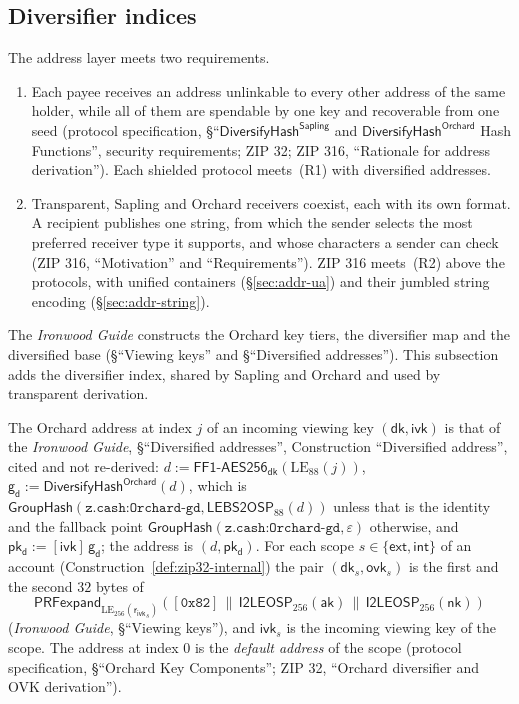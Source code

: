 \documentclass[11pt,a4paper]{article}
\theoremstyle{definition}
\newcommand{\GroupHash}{\ensuremath{\mathsf{GroupHash}}}
\newcommand{\aksym}{\ensuremath{\mathsf{ak}}}
\newcommand{\nksym}{\ensuremath{\mathsf{nk}}}
\newcommand{\ivk}{\ensuremath{\mathsf{ivk}}}
\newcommand{\ovk}{\ensuremath{\mathsf{ovk}}}
\newcommand{\dk}{\ensuremath{\mathsf{dk}}}
\newcommand{\pkd}{\ensuremath{\mathsf{pk_d}}}
\newcommand{\gd}{\ensuremath{\mathsf{g_d}}}
\newcommand{\rivk}{\ensuremath{\mathsf{r_{ivk}}}}
\begin{document}
\subsection{Diversifier indices}\label{sec:addr-indices}

The address layer meets two requirements.
\begin{enumerate}[label=(R\arabic*)]
\item Each payee receives an address unlinkable to every other address of
  the same holder, while all of them are spendable by one key and
  recoverable from one seed (protocol specification,
  \S``$\mathsf{DiversifyHash}^{\mathsf{Sapling}}$ and
  $\mathsf{DiversifyHash}^{\mathsf{Orchard}}$ Hash Functions'', security
  requirements; ZIP 32; ZIP 316, ``Rationale for address derivation''). Each
  shielded protocol meets~(R1) with diversified addresses.
\item Transparent, Sapling and Orchard receivers coexist, each with its own
  format. A recipient publishes one string, from which the sender selects
  the most preferred receiver type it supports, and whose characters a
  sender can check (ZIP 316, ``Motivation'' and ``Requirements''). ZIP 316
  meets~(R2) above the protocols, with unified
  containers (\S\ref{sec:addr-ua}) and their jumbled string encoding
  (\S\ref{sec:addr-string}).
\end{enumerate}
The \emph{Ironwood Guide} constructs the Orchard key tiers, the diversifier
map and the diversified base (\S``Viewing keys'' and \S``Diversified
addresses''). This subsection adds the diversifier index, shared by Sapling
and Orchard and used by transparent derivation.

The Orchard address at index $j$ of an incoming viewing key $(\dk, \ivk)$
is that of the \emph{Ironwood Guide}, \S``Diversified addresses'',
Construction ``Diversified address'', cited and not re-derived:
$d := \mathsf{FF1\text{-}AES256}_{\dk}(\mathrm{LE}_{88}(j))$,
$\gd := \mathsf{DiversifyHash}^{\mathsf{Orchard}}(d)$, which is
$\GroupHash(\texttt{z.cash:Orchard-gd}, \mathsf{LEBS2OSP}_{88}(d))$ unless
that is the identity and the fallback point
$\GroupHash(\texttt{z.cash:Orchard-gd}, \varepsilon)$ otherwise, and
$\pkd := [\ivk]\,\gd$; the address is $(d, \pkd)$. For each scope
$s \in \{\mathsf{ext}, \mathsf{int}\}$ of an account
(Construction~\ref{def:zip32-internal}) the pair $(\dk_s, \ovk_s)$ is the
first and the second $32$ bytes of
\[
  \mathsf{PRFexpand}_{\mathrm{LE}_{256}(\rivk_s)}([\mathtt{0x82}] \,\|\,
  \mathsf{I2LEOSP}_{256}(\aksym) \,\|\, \mathsf{I2LEOSP}_{256}(\nksym))
\]
(\emph{Ironwood Guide}, \S``Viewing keys''), and $\ivk_s$ is the incoming
viewing key of the scope. The address at index $0$ is the \emph{default
address} of the scope (protocol specification, \S``Orchard Key
Components''; ZIP 32, ``Orchard diversifier and OVK derivation'').
\end{document}
